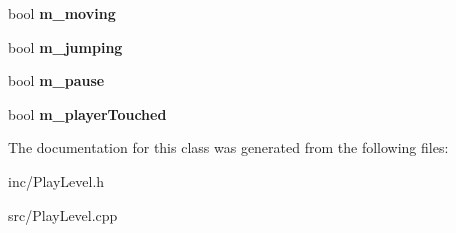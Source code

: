 \begin{DoxyCompactItemize}
\mbox{\label{class_play_level_afbb3ff300f99b3d5a7d77c4078079bda}} 
bool {\bfseries m\+\_\+moving}
\item 
\mbox{\label{class_play_level_a75daf016c11754224286f030393b2a09}} 
bool {\bfseries m\+\_\+jumping}
\item 
\mbox{\label{class_play_level_aa7f8fd3c0e9e947b50a9b563fb41231a}} 
bool {\bfseries m\+\_\+pause}
\item 
\mbox{\label{class_play_level_a763d7a58643cd287a96185a73e0372c2}} 
bool {\bfseries m\+\_\+player\+Touched}
\end{DoxyCompactItemize}


The documentation for this class was generated from the following files\+:\begin{DoxyCompactItemize}
\item 
inc/Play\+Level.\+h\item 
src/Play\+Level.\+cpp\end{DoxyCompactItemize}
